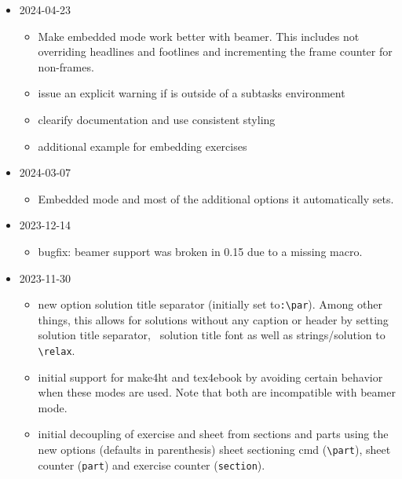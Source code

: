 \documentclass[DIV12,BCOR0mm]{scrartcl}
\newcommand{\optionstyle}{\normalfont\ttfamily\color{red!50!black}}
\newcommand{\option}[1]{{\optionstyle #1}}
\newcommand{\vers}[1]{{\normalfont\ttfamily\color{black!90} #1}}
\newcommand{\versitem}[1][]{\item[v. \vers{#1}]}
\newcommand{\binary}[1]{{\normalfont\ttfamily\color{yellow!50!black}#1}}
\begin{document}
\begin{itemize}
    \versitem[0.17:]  2024-04-23
      \begin{itemize}
        \item Make embedded mode work better with beamer. This
        includes not overriding headlines and footlines and
        incrementing the frame counter for non-frames.
        \item issue an explicit warning if \string\subtask is outside of a subtasks environment
        \item clearify documentation and use consistent styling
        \item additional example for embedding exercises
      \end{itemize}
    \versitem[0.16:]  2024-03-07
      \begin{itemize}
        \item Embedded mode and most of the additional options it
        automatically sets.
      \end{itemize}
    \versitem[0.15.1:]  2023-12-14
      \begin{itemize}
        \item bugfix: beamer support was broken in \vers{0.15} due to
        a missing macro.
      \end{itemize}
    \versitem[0.15:]  2023-11-30
      \begin{itemize}
        \item new option \option{solution title separator}
        (initially set to\lstinline|:\par|). Among other things, this
        allows for solutions without any caption or header by
        setting \option{solution title separator},~
        \option{solution title font} as well as
        \option{strings/solution} to \lstinline|\relax|.
        \item initial support for \binary{make4ht} and
        \binary{tex4ebook} by avoiding certain behavior when these
        modes are used. Note that both are incompatible with beamer
        mode.
        \item initial decoupling of exercise and sheet from
        sections and parts using the new options (defaults in
        parenthesis) \option{sheet sectioning cmd} (\lstinline|\part|),
        \option{sheet counter} (\lstinline|part|) and
        \option{exercise counter} (\lstinline|section|).

\end{itemize}
\end{itemize}
\end{document}
